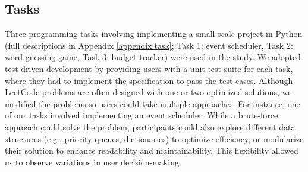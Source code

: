 \subsection{Tasks}
Three programming tasks involving implementing a small-scale project in Python (full descriptions in Appendix \ref{appendix:task}; Task 1: event scheduler, Task 2: word guessing game, Task 3: budget tracker) were used in the study. 
We adopted test-driven development by providing users with a unit test suite for each task, where they had to implement the specification to pass the test cases. 
Although LeetCode problems are often designed with one or two optimized solutions, we modified the problems so users could take multiple approaches. For instance, one of our tasks involved implementing an event scheduler. While a brute-force approach could solve the problem, participants could also explore different data structures (e.g., priority queues, dictionaries) to optimize efficiency, or modularize their solution to enhance readability and maintainability. This flexibility allowed us to observe variations in user decision-making.
